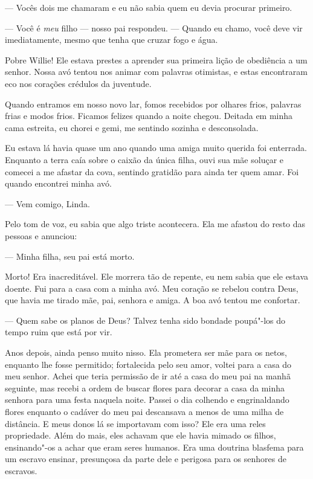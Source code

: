 --- Vocês dois me chamaram e eu não sabia quem eu devia procurar
primeiro.

--- Você é \emph{meu} filho --- nosso
pai respondeu. --- Quando eu chamo, você deve vir imediatamente, mesmo
que tenha que cruzar fogo e água.

Pobre Willie! Ele estava prestes a
aprender sua primeira lição de obediência a um senhor. Nossa avó tentou
nos animar com palavras otimistas, e estas encontraram eco nos corações
crédulos da juventude.

Quando entramos em nosso novo lar,
fomos recebidos por olhares frios, palavras frias e modos frios. Ficamos
felizes quando a noite chegou. Deitada em minha cama estreita, eu chorei
e gemi, me sentindo sozinha e desconsolada.

Eu estava lá havia quase um ano quando
uma amiga muito querida foi enterrada. Enquanto a terra caía sobre o
caixão da única filha, ouvi sua mãe soluçar e comecei a me afastar da
cova, sentindo gratidão para ainda ter quem amar. Foi quando encontrei
minha avó.

--- Vem comigo, Linda.

Pelo tom de voz, eu sabia que algo triste acontecera. Ela me afastou do
resto das pessoas e anunciou:

--- Minha filha, seu pai está morto.

Morto! Era inacreditável. Ele morrera tão de repente, eu nem sabia que
ele estava doente. Fui para a casa com a minha avó. Meu coração se
rebelou contra Deus, que havia me tirado mãe, pai, senhora e amiga. A
boa avó tentou me confortar.

--- Quem sabe os planos de Deus? Talvez tenha sido bondade poupá"-los do
tempo ruim que está por vir.

Anos depois, ainda penso muito nisso. Ela prometera ser mãe para os
netos, enquanto lhe fosse permitido; fortalecida pelo seu amor, voltei
para a casa do meu senhor. Achei que teria permissão de ir até a casa do
meu pai na manhã seguinte, mas recebi a ordem de buscar flores para
decorar a casa da minha senhora para uma festa naquela noite. Passei o
dia colhendo e engrinaldando flores enquanto o cadáver do meu pai
descansava a menos de uma milha de distância. E meus donos lá se
importavam com isso? Ele era uma reles propriedade. Além do mais, eles
achavam que ele havia mimado os filhos, ensinando"-os a achar que eram
seres humanos. Era uma doutrina blasfema para um escravo ensinar,
presunçosa da parte dele e perigosa para os senhores de escravos.

